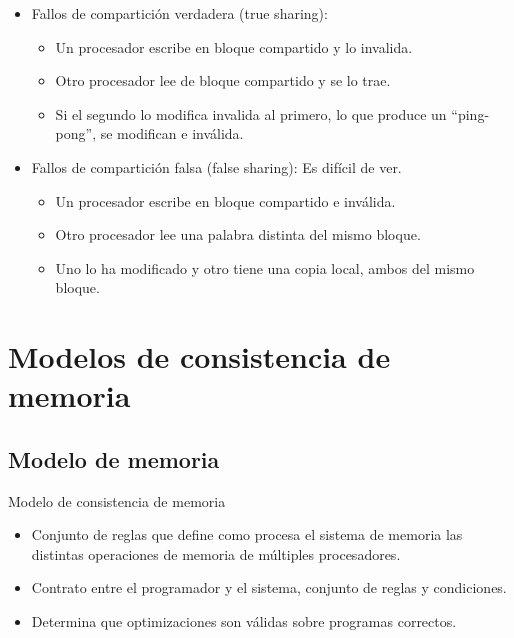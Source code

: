 \documentclass[12pt, twoside, openright]{report} %
\begin{document}
    \begin{itemize}
    
    \item
      Fallos de compartición verdadera (true sharing):

      \begin{itemize}
      
      \item
        Un procesador escribe en bloque compartido y lo invalida.
      \item
        Otro procesador lee de bloque compartido y se lo trae.
      \item
        Si el segundo lo modifica invalida al primero, lo que produce
        un ``ping-pong'', se modifican e inválida.
      \end{itemize}
    \item
      Fallos de compartición falsa (false sharing): Es difícil de ver.

      \begin{itemize}
      
      \item
        Un procesador escribe en bloque compartido e inválida.
      \item
        Otro procesador lee una palabra distinta del mismo bloque.
      \item
        Uno lo ha modificado y otro tiene una copia local, ambos del
        mismo bloque.
      \end{itemize}
    \end{itemize}
    
\section{Modelos de consistencia de memoria}


  
\subsection{Modelo de memoria}


    Modelo de consistencia de memoria

    \begin{itemize}
    
    \item
      Conjunto de reglas que define como procesa el sistema de memoria
      las distintas operaciones de memoria de múltiples procesadores.
    \item
      Contrato entre el programador y el sistema, conjunto de reglas y
      condiciones.
    \item
      Determina que optimizaciones son válidas sobre programas
      correctos.
    \end{itemize}
\end{document}
